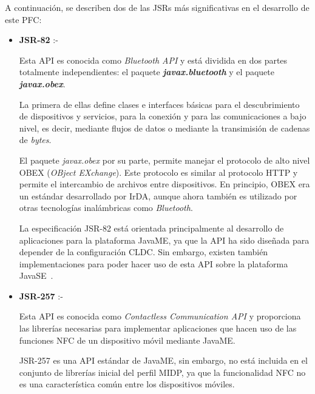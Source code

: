 A continuación, se describen dos de las \acs{JSR}s más significativas
en el desarrollo de este \acs{PFC}:

\begin{itemize}
\item \textbf{\acs{JSR}-82} :- %

Esta \acs{API} es conocida como \emph{Bluetooth \acs{API}} y está dividida en
dos partes totalmente independientes: el paquete
\emph{\textbf{javax.bluetooth}} y el paquete \emph{\textbf{javax.obex}}.

La primera de ellas define clases e interfaces básicas para el descubrimiento
de dispositivos y servicios, para la conexión y para las comunicaciones a bajo 
nivel, es decir, mediante flujos de datos o mediante la transimisión de cadenas
de \emph{bytes}.

El paquete \emph{javax.obex} por su parte, permite manejar el protocolo de
alto nivel \acs{OBEX} (\emph{OBject EXchange}). Este protocolo es similar
al protocolo \acs{HTTP} y permite el intercambio de archivos entre
dispositivos. En principio, \acs{OBEX} era un estándar desarrollado por
\acs{IrDA}, aunque ahora también es utilizado por otras tecnologías
inalámbricas como \emph{Bluetooth}.

La especificación \acs{JSR}-82 está orientada principalmente al desarrollo
de aplicaciones para la plataforma \acs{JavaME}, ya que la \acs{API} ha sido
diseñada para depender de la configuración \acs{CLDC}. Sin embargo, existen
también implementaciones para poder hacer uso de esta \acs{API} sobre la
plataforma \acs{JavaSE}~\cite{bib:jsr82}.

\item \textbf{\acs{JSR}-257} :- %

Esta \acs{API} es conocida como \emph{Contactless Communication \acs{API}} y
proporciona las librerías necesarias para implementar aplicaciones que
hacen uso de las funciones \acs{NFC} de un dispositivo móvil mediante
\acs{JavaME}.

\acs{JSR}-257 es una \acs{API} estándar de \acs{JavaME}, sin embargo, no
está incluida en el conjunto de librerías inicial del perfil \acs{MIDP}, ya
que la funcionalidad \acs{NFC} no es una característica común entre los
dispositivos móviles.


\end{itemize}
